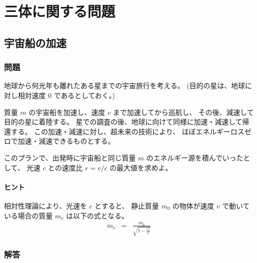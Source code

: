 \section{三体に関する問題}
\label{s:三体に関する問題}

\subsection{宇宙船の加速}
\label{ssec:宇宙船の加速}
\subsubsection{問題}
\label{sssec:宇宙船の加速:問題}

地球から何光年も離れたある星までの宇宙旅行を考える。
(目的の星は、地球に対し相対速度 0 であるとしておく。)

質量 $m$ の宇宙船を加速し、速度 $v$ まで加速してから巡航し、
その後、減速して目的の星に着陸する。
星での調査の後、地球に向けて同様に加速・減速して帰還する。
この加速・減速に対し、超未来の技術により、
ほぼエネルギーロスゼロで加速・減速できるものとする。

このプランで、出発時に宇宙船と同じ質量 $m$ のエネルギー源を積んでいったとして、
光速 $c$ との速度比 $r = v/c$ の最大値を求めよ。

\paragraph*{ヒント}
相対性理論により、光速を $c$ とすると、
静止質量 $m_0$ の物体が速度 $v$ で動いている場合の質量 $m_v$ は以下の式となる。
  \begin{eqnarray}
    m_v & = & \frac{m_0}{\sqrt{1-\frac{v^2}{c^2}}}
  \end{eqnarray}

\clearpage
\subsubsection{解答}
\label{sssec:宇宙船の加速:解答}

